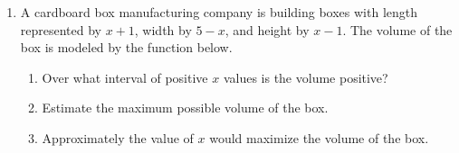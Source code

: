 \documentclass[12pt, twoside]{article}
\begin{document}
\begin{enumerate}
\newpage
\item A cardboard box manufacturing company is building boxes with length represented by $x+1$, width by $5-x$, and height by $x-1$. The volume of the box is modeled by the function below.
    \begin{multicols}{2}
    
    \begin{enumerate}[itemsep=0.75cm]
        \item Over what interval of positive $x$ values is the volume positive?
        \item Estimate the maximum possible volume of the box.
        \item Approximately the value of $x$ would maximize the volume of the box.
    \end{enumerate} 
\end{multicols}


\end{enumerate}
\end{document}
